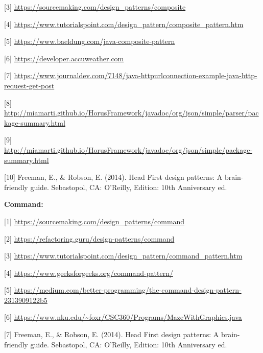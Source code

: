\documentclass[10pt,portuguese]{article}
\begin{document}
[3] \url{https://sourcemaking.com/design_patterns/composite}

[4] \url{https://www.tutorialspoint.com/design_pattern/composite_pattern.htm}

[5] \url{https://www.baeldung.com/java-composite-pattern}

[6] \url{https://developer.accuweather.com}

[7] \url{https://www.journaldev.com/7148/java-httpurlconnection-example-java-http-request-get-post}

[8] \url{http://miamarti.github.io/HorusFramework/javadoc/org/json/simple/parser/package-summary.html}

[9] \url{http://miamarti.github.io/HorusFramework/javadoc/org/json/simple/package-summary.html}

[10] Freeman, E., \& Robson, E. (2014). Head First design patterns: A brain-friendly guide. Sebastopol, CA: O'Reilly, Edition: 10th Anniversary ed.


\par \textbf{Command:}

[1] \url{https://sourcemaking.com/design_patterns/command}

[2] \url{https://refactoring.guru/design-patterns/command}

[3] \url{https://www.tutorialspoint.com/design_pattern/command_pattern.htm}

[4] \url{https://www.geeksforgeeks.org/command-pattern/}

[5] \url{https://medium.com/better-programming/the-command-design-pattern-2313909122b5}

[6] \url{https://www.nku.edu/~foxr/CSC360/Programs/MazeWithGraphics.java}

[7] Freeman, E., \& Robson, E. (2014). Head First design patterns: A brain-friendly guide. Sebastopol, CA: O'Reilly, Edition: 10th Anniversary ed.
\end{document}
